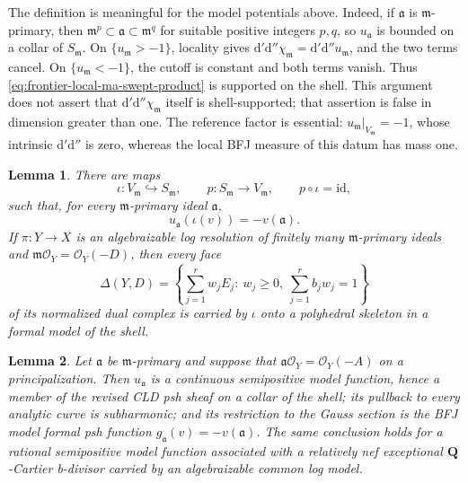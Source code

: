 \documentclass[11pt,a4paper]{article}
\newtheorem{lemma}[lemma]{Lemma}
\theoremstyle{definition}
\theoremstyle{remark}
\newcommand{\rd}{\mathrm d}
\newcommand{\dprime}{\rd'}
\newcommand{\ddprime}{\rd''}
\newcommand{\dprimeddprime}{\dprime\ddprime}
\begin{document}
The definition is meaningful for the model potentials above.  Indeed, if
\(\mathfrak a\) is \(\mathfrak m\)-primary, then
\(\mathfrak m^p\subset\mathfrak a\subset\mathfrak m^q\) for suitable
positive integers \(p,q\), so \(u_{\mathfrak a}\) is bounded on a collar of
\(S_{\mathfrak m}\).  On \(\{u_{\mathfrak m}>-1\}\), locality gives
\(\dprimeddprime\chi_{\mathfrak m}
=\dprimeddprime u_{\mathfrak m}\), and the two terms cancel.  On
\(\{u_{\mathfrak m}<-1\}\), the cutoff is constant and both terms vanish.
Thus \eqref{eq:frontier-local-ma-swept-product} is supported on the shell.
This argument does not assert that
\(\dprimeddprime\chi_{\mathfrak m}\) itself is shell-supported; that
assertion is false in dimension greater than one.  The reference factor is
essential: \(u_{\mathfrak m}|_{V_{\mathfrak m}}=-1\), whose intrinsic
\(\dprimeddprime\) is zero, whereas the local BFJ measure of this datum has
mass one.

\begin{lemma}\label{lem:frontier-local-ma-gauss}
There are maps
\[
 \iota:V_{\mathfrak m}\hookrightarrow S_{\mathfrak m},
 \qquad
 p:S_{\mathfrak m}\longrightarrow V_{\mathfrak m},
 \qquad p\circ\iota=\mathrm{id},
\]
such that, for every \(\mathfrak m\)-primary ideal \(\mathfrak a\),
\begin{equation}
             u_{\mathfrak a}(\iota(v))=-v(\mathfrak a).
 \label{eq:frontier-local-ma-gauss-ideal}
\end{equation}
If \(\pi:Y\to X\) is an algebraizable log resolution of finitely many
\(\mathfrak m\)-primary ideals and
\(\mathfrak m\mathcal O_Y=\mathcal O_Y(-D)\), then every face
\begin{equation}
 \Delta(Y,D)=
 \left\{\sum_{j=1}^r w_jE_j:\ w_j\geq0,
                       \ \sum_{j=1}^r b_jw_j=1\right\}
 \label{eq:frontier-local-ma-dual-face}
\end{equation}
of its normalized dual complex is carried by \(\iota\) onto a polyhedral
skeleton in a formal model of the shell.
\end{lemma}



\begin{lemma}\label{lem:frontier-local-ma-common-model-core}
Let \(\mathfrak a\) be \(\mathfrak m\)-primary and suppose that
\(\mathfrak a\mathcal O_Y=\mathcal O_Y(-A)\) on a principalization.  Then
\(u_{\mathfrak a}\) is a continuous semipositive model function, hence a
member of the revised CLD psh sheaf on a collar of the shell; its pullback to
every analytic curve is subharmonic; and its restriction to the Gauss
section is the BFJ model formal psh function
\(g_{\mathfrak a}(v)=-v(\mathfrak a)\).  The same conclusion holds for a
rational semipositive model function associated with a relatively nef
exceptional \(\mathbf Q\)-Cartier b-divisor carried by an algebraizable
common log model.
\end{lemma}
\end{document}
